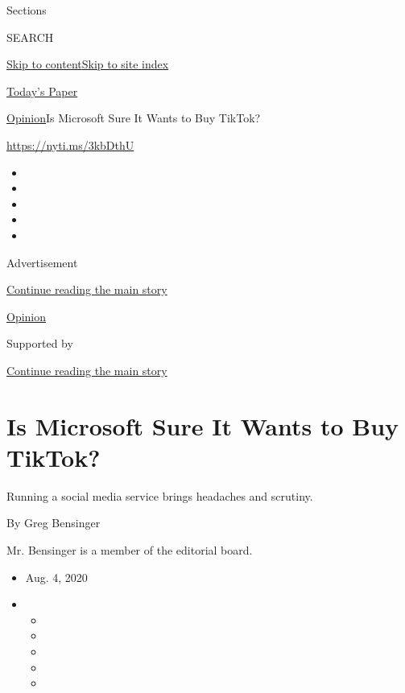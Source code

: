 Sections

SEARCH

\protect\hyperlink{site-content}{Skip to
content}\protect\hyperlink{site-index}{Skip to site index}

\href{https://myaccount.nytimes.com/auth/login?response_type=cookie\&client_id=vi}{}

\href{https://www.nytimes.com/section/todayspaper}{Today's Paper}

\href{/section/opinion}{Opinion}\textbar{}Is Microsoft Sure It Wants to
Buy TikTok?

\url{https://nyti.ms/3kbDthU}

\begin{itemize}
\item
\item
\item
\item
\item
\end{itemize}

Advertisement

\protect\hyperlink{after-top}{Continue reading the main story}

\href{/section/opinion}{Opinion}

Supported by

\protect\hyperlink{after-sponsor}{Continue reading the main story}

\hypertarget{is-microsoft-sure-it-wants-to-buy-tiktok}{%
\section{Is Microsoft Sure It Wants to Buy
TikTok?}\label{is-microsoft-sure-it-wants-to-buy-tiktok}}

Running a social media service brings headaches and scrutiny.

By Greg Bensinger

Mr. Bensinger is a member of the editorial board.

\begin{itemize}
\item
  Aug. 4, 2020
\item
  \begin{itemize}
  \item
  \item
  \item
  \item
  \item
  \end{itemize}
\end{itemize}

